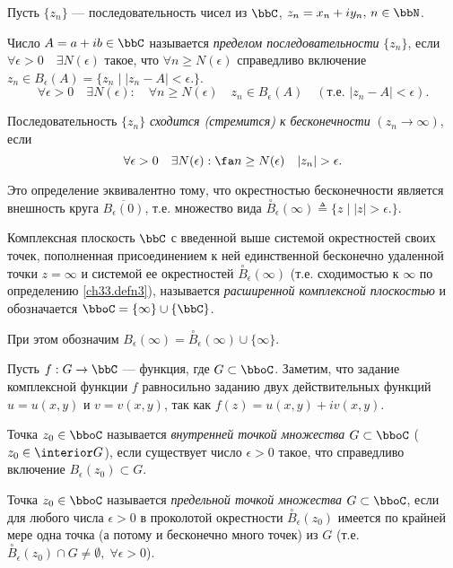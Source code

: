 Пусть $\{z_n\}$ --- последовательность чисел из $\bbC$, $z_n=x_n+iy_n, \, n \in \bbN$. 
\begin{defn}
Число $A = a+ib \in \bbC$ называется \textit{пределом последовательности} $\{z_n\}$, если $\forall \epsilon > 0\quad \exists N(\epsilon)$ такое, что $\forall n \ge N(\epsilon) $ справедливо включение $z_n \in B_\epsilon(A) = \{z_n \;\bigl|\; |z_n-A|<\epsilon \bigl.\}$.
$$
\forall \epsilon > 0\quad \exists N(\epsilon): \quad\forall n \ge N(\epsilon) \quad z_n \in B_\epsilon(A)\quad (\text{т.е. }|z_n-A|<\epsilon).
$$
\end{defn}
\begin{defn}\label{ch33.defn3}
Последовательность $\{z_n\}$ \textit{сходится (стремится) к бесконечности} $(z_n\to\infty)$, если 
$$
\forall \epsilon > 0\quad \exists N(\epsilon): \fa n \ge N(\epsilon) \quad |z_n|>\epsilon.
$$
\end{defn} 
Это определение эквивалентно тому, что окрестностью бесконечности является внешность круга $\overline{B_\epsilon(0)}$, т.е. множество вида $\overset{\circ} {B}_\epsilon(\infty)\triangleq \{z \;\bigl|\; |z|>\epsilon \bigl.\}$. 

\begin{defn}
Комплексная плоскость $\bbC$ с введенной выше системой окрестностей своих точек, пополненная присоединением к ней единственной бесконечно удаленной точки $z=\infty$ и системой ее окрестностей $\overset{\circ} {B}_\epsilon(\infty)$ (т.е. сходимостью к $\infty$ по определению \ref{ch33.defn3}), называется \textit{расширенной комплексной плоскостью} и обозначается ${\bboC =\{\infty\} \cup \{\bbC\}}$.
\end{defn}
При этом обозначим $B_\epsilon(\infty)=\overset{\circ} {B}_\epsilon(\infty) \cup\{\infty\}$.

Пусть $f: G\to \bbC$ --- функция, где $G \subset \bboC$. Заметим, что задание комплексной функции $f$ равносильно заданию двух действительных функций $u=u(x,y)$ и $v=v(x,y)$, так как $f(z)=u(x,y)+iv(x,y)$.
\begin{defn}
Точка $z_0 \in \bboC$ называется \textit{внутренней точкой множества} $G \subset \bboC$ ($z_0 \in \interior G$), если существует число $\epsilon > 0$ такое, что справедливо включение $B_\epsilon (z_0) \subset G$.
\end{defn} 

\begin{defn}
Точка $z_0 \in \bboC$ называется \textit{предельной точкой множества} $G \subset \bboC$, если для любого числа $\epsilon > 0$ в проколотой окрестности $\overset{\circ} {B}_\epsilon(z_0)$ имеется по крайней мере одна точка (а потому и бесконечно много точек) из $G$ (т.е. $\overset{\circ} {B}_\epsilon(z_0) \cap G \neq \emptyset,\; \forall\epsilon > 0$).
\end{defn}

